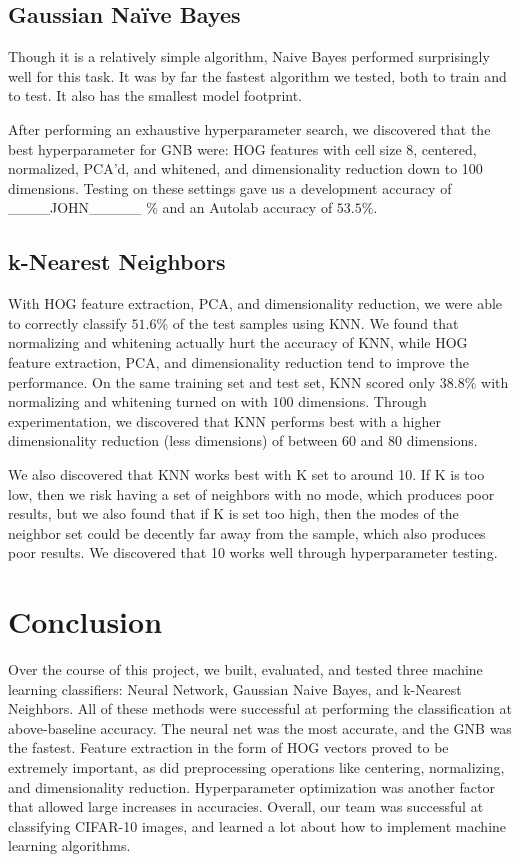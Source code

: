 \documentclass{article} %
\begin{document}
\subsection*{Gaussian Na\"ive Bayes}

Though it is a relatively simple algorithm, Naive Bayes performed surprisingly well for this task. It was by far the fastest algorithm we tested, both to train and to test. It also has the smallest model footprint.

After performing an exhaustive hyperparameter search, we discovered that the best hyperparameter for GNB were: HOG features with cell size 8, centered, normalized, PCA'd, and whitened, and dimensionality reduction down to 100 dimensions. Testing on these settings gave us a development accuracy of ____JOHN_____ \% and an Autolab accuracy of $53.5\%$.

\subsection*{k-Nearest Neighbors}

With HOG feature extraction, PCA, and dimensionality reduction, we were able to correctly classify $51.6\%$ of the test samples using KNN. We found that normalizing and whitening actually hurt the accuracy of KNN, while HOG feature extraction, PCA, and dimensionality reduction tend to improve the performance. On the same training set and test set, KNN scored only $38.8\%$ with normalizing and whitening turned on with $100$ dimensions. Through experimentation, we discovered that KNN performs best with a higher dimensionality reduction (less dimensions) of between 60 and 80 dimensions.

We also discovered that KNN works best with K set to around 10. If K is too low, then we risk having a set of neighbors with no mode, which produces poor results, but we also found that if K is set too high, then the modes of the neighbor set could be decently far away from the sample, which also produces poor results. We discovered that 10 works well through hyperparameter testing.

\section{Conclusion}

Over the course of this project, we built, evaluated, and tested three machine learning classifiers: Neural Network, Gaussian Naive Bayes, and k-Nearest Neighbors. All of these methods were successful at performing the classification at above-baseline accuracy. The neural net was the most accurate, and the GNB was the fastest. Feature extraction in the form of HOG vectors proved to be extremely important, as did preprocessing operations like centering, normalizing, and dimensionality reduction. Hyperparameter optimization was another factor that allowed large increases in accuracies. Overall, our team was successful at classifying CIFAR-10 images, and learned a lot about how to implement machine learning algorithms.
\end{document}
